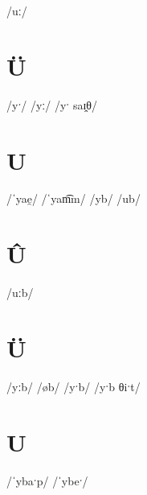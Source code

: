 \documentclass[10pt,a4paper,twoside]{book}
\begin{document}
\begin{multicols}{3}
 {/uː/} {}
\end{multicols}

\section*{Ü}

\begin{multicols}{3}
 {/yˑ/} {}
 {/yː/} {}
 {/yˑ saɪ̯θ/} {}
\end{multicols}

\section*{U}

\begin{multicols}{3}
 {/ˈyae̯/} {}
 {/ˈyam͡m/} {}
 {/yb/} {}
 {/ub/} {}
\end{multicols}

\section*{Û}

\begin{multicols}{3}
 {/uːb/} {}
\end{multicols}

\section*{Ü}

\begin{multicols}{3}
 {/yːb/} {}
 {/øb/} {}
 {/yˑb/} {}
 {/yˑb θiˑt/} {}
\end{multicols}

\section*{U}

\begin{multicols}{3}
 {/ˈybaˑp/} {}
 {/ˈybeˑ/} {}
\end{multicols}
\end{document}
